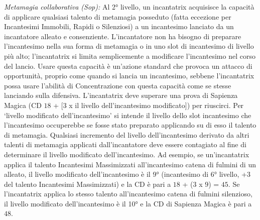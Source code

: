 \documentclass[10pt, a4paper]{report}
\begin{document}
\begin{multicols}{2}
\textit{Metamagia collaborativa (Sop):} Al 2° livello, un incantatrix acquisisce la capacità di applicare qualsiasi talento di metamagia posseduto (fatta eccezione per Incantesimi Immobili, Rapidi o Silenziosi) a un incantesimo lanciato da un incantatore alleato e consenziente. L'incantatore non ha bisogno di preparare l'incantesimo nella sua forma di metamagia o in uno slot di incantesimo di livello più alto; l'incantatrix si limita semplicemente a modificare l'incantesimo nel corso del lancio. Usare questa capacità è un'azione standard che provoca un attacco di opportunità, proprio come quando si lancia un incantesimo, sebbene l'incantatrix possa usare l'abilità di Concentrazione con questa capacità come se stesse lanciando sulla difensiva. L'incantatrix deve superare una prova di Sapienza Magica (CD $18$ + [$3$ x il livello dell'incantesimo modificato]) per riuscirci. Per \enquote*{livello modificato dell'incantesimo} si intende il livello dello slot incantesimo che l'incantesimo occuperebbe se fosse stato preparato applicando su di esso il talento di metamagia. Qualsiasi incremento del livello dell'incantesimo derivato da altri talenti di metamagia applicati dall'incantatore deve essere contagiato al fine di determinare il livello modificato dell'incantesimo. Ad esempio, se un'incantatrix applica il talento Incantesimi Massimizzati all'incantesimo catena di fulmini di un alleato, il livello modificato dell'incantesimo è il 9° (incantesimo di 6° livello, +3 del talento Incantesimi Massimizzati) e la CD è pari a $18$ + ($3$ x $9$) = $45$. Se l'incantatrix applica lo stesso talento all'incantesimo catena di fulmini silenzioso, il livello modificato dell'incantesimo è il 10° e la CD di Sapienza Magica è pari a $48$.


\end{multicols}
\end{document}

